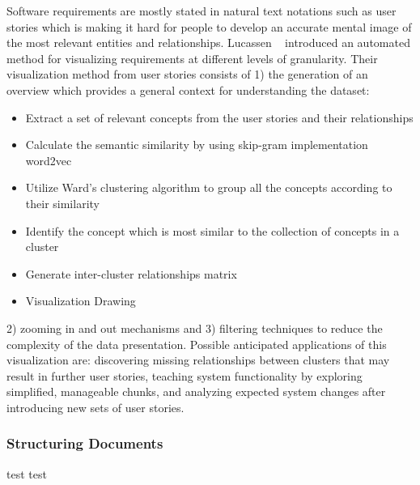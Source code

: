 Software requirements are mostly stated in natural text notations such as user stories which is making it hard for people to develop an accurate mental image of the most relevant entities and relationships. Lucassen \etal~\cite{Lucassen:2016} introduced an automated method for visualizing requirements at different levels of granularity. Their visualization method from user stories consists of 1) the generation of an overview which provides a general context for understanding the dataset: 
\begin{itemize}
\item Extract a set of relevant concepts from the user stories and their relationships 
\item Calculate the semantic similarity by using skip-gram implementation word2vec
\item Utilize Ward’s clustering algorithm to group all the concepts according to their similarity 
\item Identify the concept which is most similar to the collection of concepts in a cluster
\item Generate inter-cluster relationships matrix
\item Visualization Drawing
\end{itemize}
2) zooming in and out mechanisms and 3) filtering techniques to reduce the complexity of the data presentation. Possible anticipated applications of this visualization are: discovering missing relationships between clusters that may result in further user stories, teaching system functionality by exploring simplified, manageable chunks, and analyzing expected system changes after introducing new sets of user stories. 

\subsubsection{Structuring Documents}

test
test